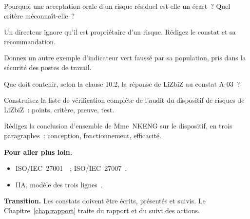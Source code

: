 \begin{boxexo}[title={\ding{45}\quad Exercice~14.5. Acceptation orale \niveaumoyen}]
Pourquoi une acceptation orale d'un risque résiduel est-elle un écart~?
Quel critère méconnaît-elle~?
\end{boxexo}

\begin{boxexo}[title={\ding{45}\quad Exercice~14.6. Le propriétaire qui s'ignore \niveaumoyen}]
Un directeur ignore qu'il est propriétaire d'un risque. Rédigez le
constat et sa recommandation.
\end{boxexo}

\begin{boxexo}[title={\ding{45}\quad Exercice~14.7. Population \niveaumoyen}]
Donnez un autre exemple d'indicateur vert faussé par sa population, pris
dans la sécurité des postes de travail.
\end{boxexo}

\begin{boxexo}[title={\ding{45}\quad Exercice~14.8. Clause 10.2 \niveaumoyen}]
Que doit contenir, selon la clause 10.2, la réponse de LiZbiZ au constat
A-03~?
\end{boxexo}

\begin{boxexo}[title={\ding{45}\quad Exercice~14.9. Programme de tests \niveauexpert}]
Construisez la liste de vérification complète de l'audit du dispositif de
risques de LiZbiZ~: points, critère, preuve, test.
\end{boxexo}

\begin{boxexo}[title={\ding{45}\quad Exercice~14.10. Opinion d'ensemble \niveauexpert}]
Rédigez la conclusion d'ensemble de Mme~NKENG sur le dispositif, en trois
paragraphes~: conception, fonctionnement, efficacité.
\end{boxexo}

\bigskip

\begin{boxinfo}
\textbf{Pour aller plus loin.}
\begin{itemize}
    \item ISO/IEC~27001~\cite{iso27001_2022}~; ISO/IEC~27007~\cite{iso27007_2020}.
    \item IIA, modèle des trois lignes~\cite{iia2020troislignes}.
\end{itemize}
\end{boxinfo}

\begin{boxinfo}
\textbf{Transition.} Les constats doivent être écrits, présentés et
suivis. Le Chapitre~\ref{chap:rapport} traite du rapport et du suivi des
actions.
\end{boxinfo}
